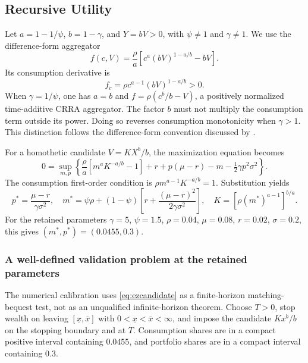 \subsection{Recursive Utility}\label{sec:recursive}
Let $a=1-1/\psi$, $b=1-\gamma$, and $Y=bV>0$, with $\psi\ne1$ and $\gamma\ne1$. We use the difference-form aggregator
\begin{equation}\label{eq:ez}
 f(c,V)=\frac\rho a\left[c^a(bV)^{1-a/b}-bV\right].
\end{equation}
Its consumption derivative is
\begin{equation}\label{eq:ezderivative}
 f_c=\rho c^{a-1}(bV)^{1-a/b}>0.
\end{equation}
When $\gamma=1/\psi$, one has $a=b$ and $f=\rho(c^b/b-V)$, a positively normalized time-additive CRRA aggregator. The factor $b$ must not multiply the consumption term outside its power. Doing so reverses consumption monotonicity when $\gamma>1$. This distinction follows the difference-form convention discussed by \citet{herdegen2021}.

For a homothetic candidate $V=KX^b/b$, the maximization equation becomes
\begin{equation}\label{eq:eznormalized}
 0=\sup_{m,p}\left\{\frac\rho a[m^aK^{-a/b}-1]
       +r+p(\mu-r)-m-\tfrac12\gamma p^2\sigma^2\right\}.
\end{equation}
The consumption first-order condition is $\rho m^{a-1}K^{-a/b}=1$. Substitution yields
\begin{equation}\label{eq:ezcandidate}
 p^*=\frac{\mu-r}{\gamma\sigma^2},\quad
 m^*=\psi\rho+(1-\psi)\left[r+\frac{(\mu-r)^2}{2\gamma\sigma^2}\right],\quad
 K=[\rho(m^*)^{a-1}]^{b/a}.
\end{equation}
For the retained parameters $\gamma=5$, $\psi=1.5$, $\rho=0.04$, $\mu=0.08$, $r=0.02$, $\sigma=0.2$, this gives $(m^*,p^*)=(0.0455,0.3)$.

\subsubsection{A well-defined validation problem at the retained parameters}
The numerical calibration uses \eqref{eq:ezcandidate} as a finite-horizon matching-bequest test, not as an unqualified infinite-horizon theorem. Choose $T>0$, stop wealth on leaving $[\underline x,\bar x]$ with $0<\underline x<\bar x<\infty$, and impose the candidate $Kx^b/b$ on the stopping boundary and at $T$. Consumption shares are in a compact positive interval containing $0.0455$, and portfolio shares are in a compact interval containing $0.3$.

